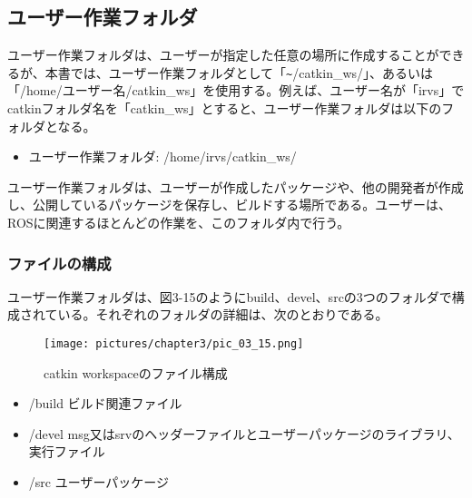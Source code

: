 \subsection{ユーザー作業フォルダ}

ユーザー作業フォルダは、ユーザーが指定した任意の場所に作成することができるが、本書では、ユーザー作業フォルダとして「\verb|~|/catkin\_ws/」、あるいは「/home/ユーザー名/catkin\_ws」を使用する。例えば、ユーザー名が「irvs」でcatkinフォルダ名を「catkin\_ws」とすると、ユーザー作業フォルダは以下のフォルダとなる。

\vspace{\baselineskip}
\begin{itemize}
\item ユーザー作業フォルダ: /home/irvs/catkin\_ws/
\end{itemize}
\vspace{\baselineskip}

ユーザー作業フォルダは、ユーザーが作成したパッケージや、他の開発者が作成し、公開しているパッケージを保存し、ビルドする場所である。ユーザーは、ROSに関連するほとんどの作業を、このフォルダ内で行う。

\subsubsection{ファイルの構成}
ユーザー作業フォルダは、図3-15のようにbuild、devel、srcの3つのフォルダで構成されている。それぞれのフォルダの詳細は、次のとおりである。

\begin{figure}[h]
  \centering
  \texttt{[image: pictures/chapter3/pic\_03\_15.png]}
  \caption{catkin workspaceのファイル構成}
\end{figure}

\vspace{\baselineskip}
\begin{itemize}
\item /build  ビルド関連ファイル
\item /devel  msg又はsrvのヘッダーファイルとユーザーパッケージのライブラリ、実行ファイル
\item /src    ユーザーパッケージ
\end{itemize}
\vspace{\baselineskip}

